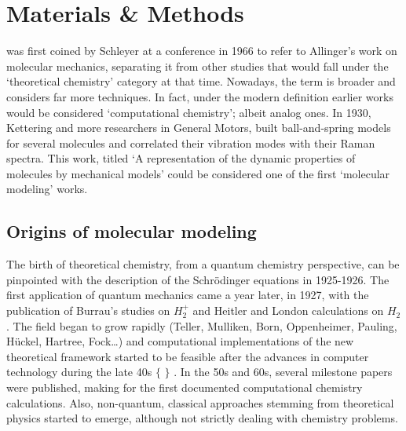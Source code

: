 \chapter{Materials \& Methods}
\label{chap:02}

 was first coined by Schleyer at a conference in 1966 to refer to Allinger’s work on molecular mechanics, separating it from other studies that would fall under the ‘theoretical chemistry’ category at that time. Nowadays, the term is broader and considers far more techniques. In fact, under the modern definition earlier works would be considered ‘computational chemistry’; albeit analog ones. In 1930, Kettering and more researchers in General Motors, built ball-and-spring models for several molecules and correlated their vibration modes with their Raman spectra. This work, titled ‘A representation of the dynamic properties of molecules by mechanical models’ could be considered one of the first ‘molecular modeling’ works.

\section{Origins of molecular modeling}
The birth of theoretical chemistry, from a quantum chemistry perspective, can be pinpointed with the description of the Schrödinger equations in 1925-1926.\cite{schrodinger} The first application of quantum mechanics came a year later, in 1927, with the publication of Burrau’s studies on $H_{2}^{+}$\cite{burrau1927} and Heitler and London calculations on $H_{2}$.\cite{heitlerlondon} The field began to grow rapidly (Teller,\cite{teller1930hydrogen} Mulliken,\cite{mulliken} Born,\cite{born} Oppenheimer,\cite{Oppenheimer} Pauling,\cite{pauling} Hückel,\cite{huckel} Hartree,\cite{hartree} Fock\cite{fock}\ldots) and computational implementations of the new theoretical framework started to be feasible after the advances in computer technology during the late 40s $ \{ $ $ \} $ . In the 50s and 60s, several milestone papers were published, making for the first documented computational chemistry calculations.\cite{bolcer2007,ccl} Also, non-quantum, classical approaches stemming from theoretical physics started to emerge, although not strictly dealing with chemistry problems.\cite{Alder1959,Gibson1960,Rahman1964}

